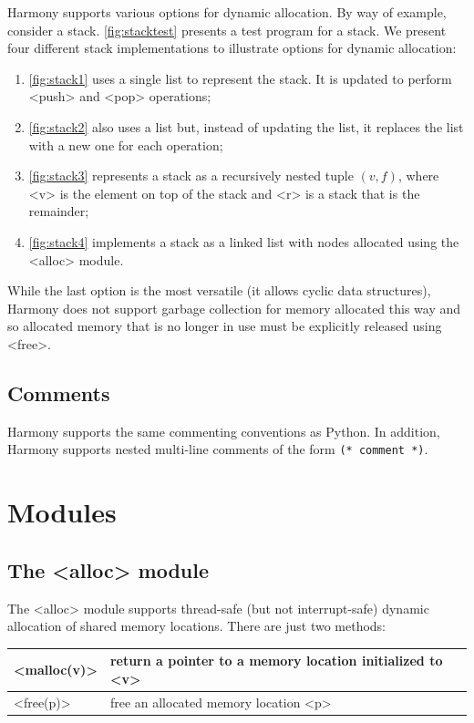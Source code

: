 \documentclass{report}
\begin{document}
Harmony supports various options for dynamic allocation.
By way of example, consider a stack.
\autoref{fig:stacktest} presents a test program for a stack.
We present four different stack implementations to illustrate
options for dynamic allocation:
\begin{enumerate}
\item[] \autoref{fig:stack1} uses a single list to represent the
stack.  It is updated to perform <{push}> and <{pop}> operations;
\item[] \autoref{fig:stack2} also uses a list but, instead of updating
the list, it replaces the list with a new one for each operation;
\item[] \autoref{fig:stack3} represents a stack as a recursively nested tuple
$(v, f)$, where <{v}> is the element on top of the stack and <{r}> is a stack
that is the remainder;
\item[] \autoref{fig:stack4} implements a stack as a linked list with nodes
allocated using the <{alloc}> module.
\end{enumerate}

While the last option is the most versatile (it allows cyclic
data structures), Harmony does not support garbage collection
for memory allocated this way and so allocated memory that is no
longer in use must be explicitly released using <{free}>.

\section{Comments}

Harmony supports the same commenting conventions as Python.
In addition, Harmony supports nested multi-line comments
of the form \texttt{(* comment *)}.

\chapter{Modules}
\label{ap:module}

\section{The <{alloc}> module}

The <{alloc}> module
%
supports thread-safe (but not interrupt-safe) dynamic allocation of
shared memory locations.  There are just two methods:

\vspace{1em}
\begin{tabular}{|l|l|}
\hline
<{malloc(v)}> & return a pointer to a memory location initialized to <{v}> \\
\hline
<{free(p)}> & free an allocated memory location <{p}> \\
\hline
\end{tabular}
\vspace{1em}
\end{document}
